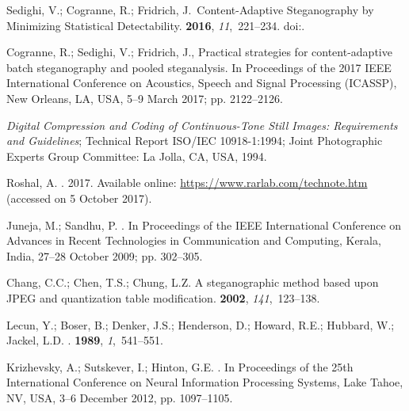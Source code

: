 \documentclass[futureinternet,article,accept,moreauthors,pdftex,10pt,a4paper]{Definitions/mdpi}
\begin{document}
\begin{thebibliography}{999}
Sedighi, V.; Cogranne, R.; Fridrich, J.~{Content-Adaptive Steganography by Minimizing Statistical
  Detectability}.
 {\bf
  2016}, {\em 11},~221--234.
\newblock
  doi:{\href{https://doi.org/10.1109/TIFS.2015.2486744}{}}.

Cogranne, R.; Sedighi, V.; Fridrich, J., {Practical strategies for
  content-adaptive batch steganography and pooled steganalysis}. In {Proceedings of the 2017 IEEE International Conference on Acoustics, Speech and  Signal Processing (ICASSP)},   New Orleans, LA, USA,  5--9 March 2017; pp. 2122--2126.


{\em Digital Compression and Coding of Continuous-Tone Still Images: Requirements
  and Guidelines};
\newblock Technical Report ISO/IEC 10918-1:1994; Joint Photographic Experts
  Group Committee:  La Jolla, CA, USA, 1994.

Roshal, A.
. 2017.
\newblock Available online: \url{https://www.rarlab.com/technote.htm} (accessed on 5 October 2017).

Juneja, M.; Sandhu, P.
. In {Proceedings of the IEEE International Conference on Advances in Recent Technologies  in Communication and Computing}, Kerala, India, 27--28 October 2009; pp. 302--305.


Chang, C.C.; Chen, T.S.; Chung, L.Z.
\newblock A steganographic method based upon JPEG and quantization table
  modification.
 {\bf 2002}, {\em 141},~123–138.

Lecun, Y.; Boser, B.; Denker, J.S.; Henderson, D.; Howard, R.E.; Hubbard, W.;
  Jackel, L.D.
.
 {\bf 1989}, {\em 1},~541--551.

Krizhevsky, A.; Sutskever, I.; Hinton, G.E.
. In Proceedings of the 25th International Conference on Neural Information Processing Systems, Lake Tahoe, NV, USA, 3--6 December 2012, pp. 1097--1105.



\end{thebibliography}
\end{document}
